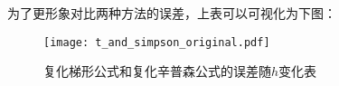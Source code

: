 
为了更形象对比两种方法的误差，上表可以可视化为下图：
\begin{figure}[!htp]
    \centering
    \texttt{[image: t\_and\_simpson\_original.pdf]} \\
    \caption{复化梯形公式和复化辛普森公式的误差随$h$变化表}
    \label{fig:t_and_simpson_R}
\end{figure}

